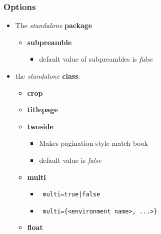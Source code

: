 \documentclass[class=article , crop=false, titlepage, twoside, multi={itemize, figure, verbatim}, float=false]{standalone}
\begin{document}
\subsubsection[Options]{\Large Options}
\begin{itemize}
\item The \emph{standalone} \textbf{package}

\begin{itemize}

\item \begin{large}\textbf{subpreamble}\end{large}

\begin{itemize}
\item default value of subpreambles is \emph{false}

\end{itemize}

\end{itemize}

\item the \emph{standalone} \textbf{class}:  
\begin{itemize}
\item \begin{large}\textbf{crop}\end{large}
\item \begin{large}\textbf{titlepage}\end{large}
\item \begin{large}\textbf{twoside}\end{large}

\begin{itemize}
\item Makes pagination style match book
\item default value is \emph{false}

\end{itemize}
\item \begin{large}\textbf{multi}\end{large}

\begin{itemize}
\item \begin{verbatim} multi=true|false \end{verbatim}
\item \begin{verbatim} multi={<environment name>, ...>}\end{verbatim}
\end{itemize}

\item \begin{large}\textbf{float}\end{large}
\end{itemize}

\end{itemize}
\end{document}
